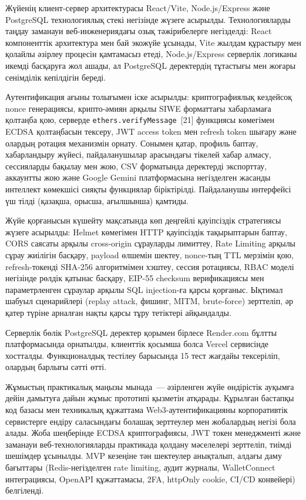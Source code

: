 \documentclass[14pt,a4paper]{extarticle}
\begin{document}
Жүйенің клиент-сервер архитектурасы React/Vite, Node.js/Express және PostgreSQL технологиялық стекі негізінде жүзеге асырылды. Технологияларды таңдау заманауи веб-инженериядағы озық тәжірибелерге негізделді: React компоненттік архитектура мен бай экожүйе ұсынады, Vite жылдам құрастыру мен қолайлы әзірлеу процесін қамтамасыз етеді, Node.js/Express серверлік логиканы икемді басқаруға жол ашады, ал PostgreSQL деректердің тұтастығы мен жоғары сенімділік кепілдігін береді.

Аутентификация ағыны толығымен іске асырылды: криптографиялық кездейсоқ nonce генерациясы, крипто-әмиян арқылы SIWE форматтағы хабарламаға қолтаңба қою, серверде \texttt{ethers.verifyMessage}~[21] функциясы көмегімен ECDSA қолтаңбасын тексеру, JWT access token мен refresh token шығару және олардың ротация механизмін орнату. Сонымен қатар, профиль баптау, хабарландыру жүйесі, пайдаланушылар арасындағы тікелей хабар алмасу, сессияларды бақылау мен жою, CSV форматында деректерді экспорттау, аккаунтты жою және Google Gemini платформасына негізделген жасанды интеллект көмекшісі сияқты функциялар біріктірілді. Пайдаланушы интерфейсі үш тілді (қазақша, орысша, ағылшынша) қамтиды.

Жүйе қорғанысын күшейту мақсатында көп деңгейлі қауіпсіздік стратегиясы жүзеге асырылды: Helmet көмегімен HTTP қауіпсіздік тақырыптарын баптау, CORS саясаты арқылы cross-origin сұрауларды лимиттеу, Rate Limiting арқылы сұрау жиілігін басқару, payload өлшемін шектеу, nonce-тың TTL мерзімін қою, refresh-токенді SHA-256 алгоритмімен хэштеу, сессия ротациясы, RBAC моделі негізінде рөлдік қатынас басқару, EIP-55 checksum верификациясы мен параметрленген сұраулар арқылы SQL injection-ға қарсы қорғаныс. Ықтимал шабуыл сценарийлері (replay attack, фишинг, MITM, brute-force) зерттеліп, әр қатер түріне арналған нақты қарсы тұру тетіктері айқындалды.

Серверлік бөлік PostgreSQL деректер қорымен бірлесе Render.com бұлтты платформасында орнатылды, клиенттік қосымша болса Vercel сервисінде хостталды. Функционалдық тестілеу барысында 15 тест жағдайы тексеріліп, олардың барлығы сәтті өтті.

Жұмыстың практикалық маңызы мынада~--- әзірленген жүйе өндірістік ауқымға дейін дамытуға дайын жұмыс прототипі қызметін атқарады. Құрылған бастапқы код базасы мен техникалық құжаттама Web3-аутентификацияны корпоративтік сервистерге ендіру саласындағы болашақ зерттеулер мен жобалардың негізі бола алады. Жоба шеңберінде ECDSA криптографиясы, JWT токен менеджменті және заманауи веб-технологияларды практикада қолдану мәселелері зерттеліп, тиімді шешімдер ұсынылды. MVP кезеңіне тән шектеулер анықталып, алдағы даму бағыттары (Redis-негізделген rate limiting, аудит журналы, WalletConnect интеграциясы, OpenAPI құжаттамасы, 2FA, httpOnly cookie, CI/CD конвейері) белгіленді.
\end{document}
